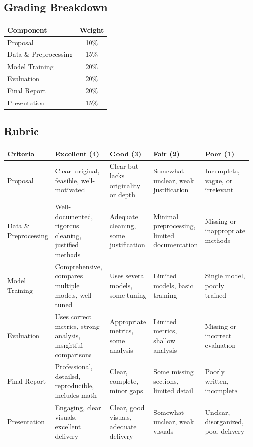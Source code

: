 \documentclass[a4paper,10pt]{article}
\begin{document}
\subsection*{Grading Breakdown}
\begin{center}
\begin{tabular}{l c}
    \hline
    Component & Weight \\
    \hline
    Proposal & 10\% \\
    Data \& Preprocessing & 15\% \\
    Model Training & 20\% \\
    Evaluation & 20\% \\
    Final Report & 20\% \\
    Presentation & 15\% \\
    \hline
\end{tabular}
\end{center}

\newpage
\subsection*{Rubric}
\renewcommand{\arraystretch}{1.4}
\begin{center}
\begin{tabular}{|p{3cm}|p{3cm}|p{3cm}|p{3cm}|p{3cm}|}
    \hline
    \textbf{Criteria} & \textbf{Excellent (4)} & \textbf{Good (3)} & \textbf{Fair (2)} & \textbf{Poor (1)} \\
    \hline
    Proposal & Clear, original, feasible, well-motivated & Clear but lacks originality or depth & Somewhat unclear, weak justification & Incomplete, vague, or irrelevant \\
    \hline
    Data \& Preprocessing & Well-documented, rigorous cleaning, justified methods & Adequate cleaning, some justification & Minimal preprocessing, limited documentation & Missing or inappropriate methods \\
    \hline
    Model Training & Comprehensive, compares multiple models, well-tuned & Uses several models, some tuning & Limited models, basic training & Single model, poorly trained \\
    \hline
    Evaluation & Uses correct metrics, strong analysis, insightful comparisons & Appropriate metrics, some analysis & Limited metrics, shallow analysis & Missing or incorrect evaluation \\
    \hline
    Final Report & Professional, detailed, reproducible, includes math & Clear, complete, minor gaps & Some missing sections, limited detail & Poorly written, incomplete \\
    \hline
    Presentation & Engaging, clear visuals, excellent delivery & Clear, good visuals, adequate delivery & Somewhat unclear, weak visuals & Unclear, disorganized, poor delivery \\
    \hline
\end{tabular}
\end{center}
\end{document}
